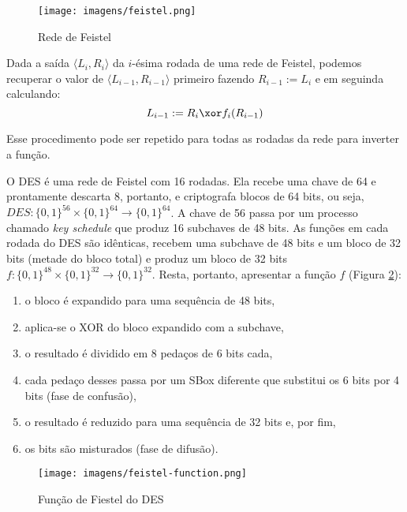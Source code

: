 \begin{figure}[htbp]
  \centering
  \texttt{[image: imagens/feistel.png]}
  \caption{Rede de Feistel}
  \label{fig:feistel}
\end{figure}

Dada a saída $\langle L_i, R_i \rangle$ da $i$-ésima rodada de uma rede de Feistel, podemos recuperar o valor de $\langle L_{i-1}, R_{i-1} \rangle$ primeiro fazendo $R_{i-1} := L_i$ e em seguinda calculando:
\begin{displaymath}
  L_{i-1} := R_i \xor f_i(R_{i-1})
\end{displaymath}

Esse procedimento pode ser repetido para todas as rodadas da rede para inverter a função.

O DES é uma rede de Feistel com 16 rodadas.
Ela recebe uma chave de 64 e prontamente descarta 8, portanto, e criptografa blocos de 64 bits, ou seja, $DES: \{0,1\}^{56} \times \{0,1\}^{64} \to \{0,1\}^{64}$.
A chave de 56 passa por um processo chamado {\em key schedule} que produz 16 subchaves de 48 bits.
As funções em cada rodada do DES são idênticas, recebem uma subchave de 48 bits e um bloco de 32 bits (metade do bloco total) e produz um bloco de 32 bits $f: \{0,1\}^{48} \times \{0,1\}^{32} \to \{0,1\}^{32}$.
Resta, portanto, apresentar a função $f$ (Figura \ref{fig:feistel-function}):
\begin{enumerate}
\item o bloco é expandido para uma sequência de 48 bits,
\item aplica-se o XOR do bloco expandido com a subchave,
\item o resultado é dividido em 8 pedaços de 6 bits cada,
\item cada pedaço desses passa por um SBox diferente que substitui os 6 bits por 4 bits (fase de confusão),
\item o resultado é reduzido para uma sequência de 32 bits e, por fim,
\item os bits são misturados (fase de difusão).
\end{enumerate}

\begin{figure}[!htp]
  \centering
  \texttt{[image: imagens/feistel-function.png]}
  \caption{Função de Fiestel do DES}
  \label{fig:feistel-function}
\end{figure}


